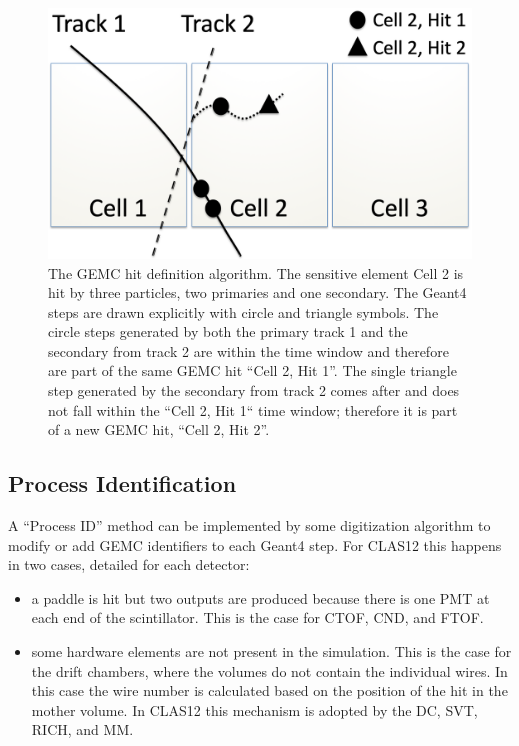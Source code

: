 \begin{figure}
	\centering
	\includegraphics[width=0.99\columnwidth,keepaspectratio]{img/hitDefinition.png}
	\caption{The GEMC hit definition algorithm. The sensitive element Cell 2 is hit by three particles, two primaries and one secondary.
             The Geant4 steps are drawn explicitly with circle and triangle symbols. The circle steps generated by both the primary track 1 and the secondary
             from track 2 are within the time window and therefore are part of the same GEMC hit ``Cell 2, Hit 1''.
             The single triangle step generated by the secondary from track 2 comes after and does not fall within the ``Cell 2, Hit 1``
             time window; therefore it is part of a new GEMC hit, ``Cell 2, Hit 2''.}
	\label{fig:hitDefinition}
\end{figure}

\subsection{Process Identification}

A ``Process ID'' method can be implemented by some digitization algorithm to modify or add GEMC identifiers to each Geant4 step. For CLAS12 this happens in two
cases, detailed for each detector:

\begin{itemize}
	\item a paddle is hit but two outputs are produced because there is one PMT at each end of the scintillator. This
          is the case for CTOF, CND, and FTOF.
    \item some hardware elements are not present in the simulation. This is the case for the drift chambers, where the volumes do not contain
          the individual wires. In this case the wire number is calculated based on the position of the hit in the mother volume. In CLAS12 this mechanism
          is adopted by the DC, SVT, RICH, and MM.
\end{itemize}


